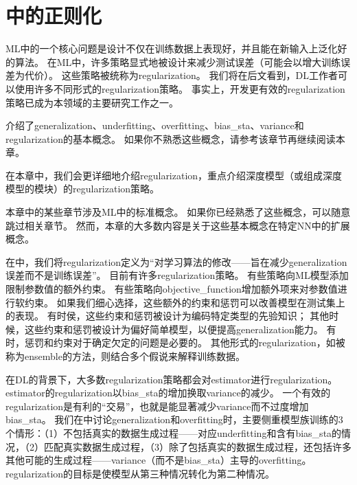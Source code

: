 \chapter{中的正则化}
\label{chap:regularization_for_deep_learning}
\gls{ML}中的一个核心问题是设计不仅在训练数据上表现好，并且能在新输入上泛化好的算法。
在\gls{ML}中，许多策略显式地被设计来减少测试误差（可能会以增大训练误差为代价）。
这些策略被统称为\gls{regularization}。
我们将在后文看到，\gls{DL}工作者可以使用许多不同形式的\gls{regularization}策略。
事实上，开发更有效的\gls{regularization}策略已成为本领域的主要研究工作之一。

介绍了\gls{generalization}、\gls{underfitting}、\gls{overfitting}、\gls{bias_sta}、\gls{variance}和\gls{regularization}的基本概念。
如果你不熟悉这些概念，请参考该章节再继续阅读本章。

在本章中，我们会更详细地介绍\gls{regularization}，重点介绍深度模型（或组成深度模型的模块）的\gls{regularization}策略。

本章中的某些章节涉及\gls{ML}中的标准概念。
如果你已经熟悉了这些概念，可以随意跳过相关章节。
然而，本章的大多数内容是关于这些基本概念在特定\gls{NN}中的扩展概念。

在中，我们将\gls{regularization}定义为``对学习算法的修改——旨在减少\gls{generalization}误差而不是训练误差''。
目前有许多\gls{regularization}策略。
有些策略向\gls{ML}模型添加限制参数值的额外约束。
有些策略向\gls{objective_function}增加额外项来对参数值进行软约束。
如果我们细心选择，这些额外的约束和惩罚可以改善模型在测试集上的表现。
有时侯，这些约束和惩罚被设计为编码特定类型的先验知识；
其他时候，这些约束和惩罚被设计为偏好简单模型，以便提高\gls{generalization}能力。
有时，惩罚和约束对于确定欠定的问题是必要的。
其他形式的\gls{regularization}，如被称为\gls{ensemble}的方法，则结合多个假说来解释训练数据。


在\gls{DL}的背景下，大多数\gls{regularization}策略都会对\gls{estimator}进行\gls{regularization}。
\gls{estimator}的\gls{regularization}以\gls{bias_sta}的增加换取\gls{variance}的减少。
一个有效的\gls{regularization}是有利的``交易''，也就是能显著减少\gls{variance}而不过度增加\gls{bias_sta}。
我们在中讨论\gls{generalization}和\gls{overfitting}时，主要侧重模型族训练的3个情形：（1）不包括真实的数据生成过程——对应\gls{underfitting}和含有\gls{bias_sta}的情况，（2）匹配真实数据生成过程，（3）除了包括真实的数据生成过程，还包括许多其他可能的生成过程——\gls{variance}（而不是\gls{bias_sta}）主导的\gls{overfitting}。
\gls{regularization}的目标是使模型从第三种情况转化为第二种情况。

